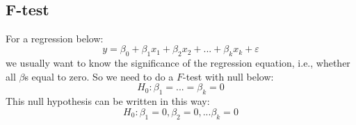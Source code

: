 \documentclass[12pt]{article}
\begin{document}
\noindent{}\\



\subsection{F-test}
For a regression below:
\begin{equation*}
y = \beta_0 + \beta_1x_1 + \beta_2x_2 + ... + \beta_{k}x_{k} + \varepsilon
\end{equation*}
we usually want to know the significance of the regression equation, i.e., whether
all $ \beta $s equal to zero.
So we need to do a  $ F $-test with null below:
\begin{equation*}
H_0: \beta_1 = ... = \beta_{k} = 0
\end{equation*}
This null hypothesis can be written in this way:
\begin{equation*}
H_0: \beta_1 = 0, \beta_2 = 0, ... \beta_{k} = 0
\end{equation*}
\end{document}
